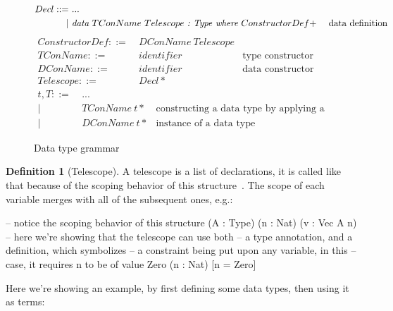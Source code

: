 \documentclass[
       embeddedlogo,
       english,
       lmodern,
       coorientadorbanca,
       noabntexcite
]{ufsc-thesis-rn46-2019}
\theoremstyle{definition}
\newtheorem{definition}{Definition}[section]
\begin{document}
\begin{figure}[H]
       \[
              \begin{aligned}
                     Decl ::= & \ ... \\
                     |        & \ \emph{data}\ TConName\ Telescope\ \emph{:\ Type\ where}\ ConstructorDef+ & \ \text{data definition}
              \end{aligned}
       \]
       \[
              \begin{aligned}
                     ConstructorDef ::= & \  DConName\ Telescope \\
                     TConName       ::= & \ identifier & \text{type constructor name} \\
                     DConName       ::= & \ identifier & \text{data constructor name} \\
                     Telescope      ::= & \ Decl*
              \end{aligned}
       \]
       \[
              \begin{aligned}
                     t, T ::= & \ ... \\
                     |        & \ TConName\ t* & \text{constructing a data type by applying a list of arguments}     \\
                     |        & \ DConName\ t* & \text{instance of a data type}
              \end{aligned}
       \]
       \caption{Data type grammar}
\end{figure}


\begin{definition}[Telescope]
       A telescope is a list of declarations, it is called like that because of the scoping behavior of this structure~\cite{oplss}.
       The scope of each variable merges with all of the subsequent ones, e.g.:
       \begin{piforall}
              -- notice the scoping behavior of this structure
              (A : Type) (n : Nat) (v : Vec A n)
              -- here we're showing that the telescope can use both
              -- a type annotation, and a definition, which symbolizes
              -- a constraint being put upon any variable, in this
              -- case, it requires n to be of value Zero
              (n : Nat) [n = Zero]
       \end{piforall}
\end{definition}

Here we're showing an example, by first defining some data types, then using it as terms:
\end{document}

